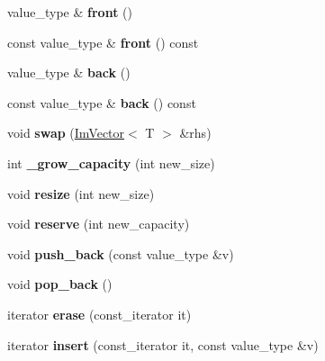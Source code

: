 \begin{DoxyCompactItemize}
value\+\_\+type \& {\bfseries front} ()
\item 
\mbox{\label{class_im_vector_a76dc6bb045574ba79b15a1941b662597}} 
const value\+\_\+type \& {\bfseries front} () const
\item 
\mbox{\label{class_im_vector_a3e4424d3fca190894598a6575f9d2401}} 
value\+\_\+type \& {\bfseries back} ()
\item 
\mbox{\label{class_im_vector_a6f22918d4f139a1c4c3410ccae726f81}} 
const value\+\_\+type \& {\bfseries back} () const
\item 
\mbox{\label{class_im_vector_afcec0d2a1e28aebe412b6efd06f0a77a}} 
void {\bfseries swap} (\mbox{\hyperlink{class_im_vector}{Im\+Vector}}$<$ T $>$ \&rhs)
\item 
\mbox{\label{class_im_vector_a4458f73e877afbef4e2e703ffe4dba9e}} 
int {\bfseries \+\_\+grow\+\_\+capacity} (int new\+\_\+size)
\item 
\mbox{\label{class_im_vector_ac371dd62e56ae486b1a5038cf07eee56}} 
void {\bfseries resize} (int new\+\_\+size)
\item 
\mbox{\label{class_im_vector_a0f14f5736c3372157856eebb67123b75}} 
void {\bfseries reserve} (int new\+\_\+capacity)
\item 
\mbox{\label{class_im_vector_a68387993f2a5f5c3b2a7139d9ab778b8}} 
void {\bfseries push\+\_\+back} (const value\+\_\+type \&v)
\item 
\mbox{\label{class_im_vector_a3db7ce62d3c429effdb893fbf7148c1c}} 
void {\bfseries pop\+\_\+back} ()
\item 
\mbox{\label{class_im_vector_a1e1fd9b678be9d4b4432fbefde976045}} 
iterator {\bfseries erase} (const\+\_\+iterator it)
\item 
\mbox{\label{class_im_vector_a52fdb731c13c82a1fd971186c6a701b5}} 
iterator {\bfseries insert} (const\+\_\+iterator it, const value\+\_\+type \&v)
\end{DoxyCompactItemize}
